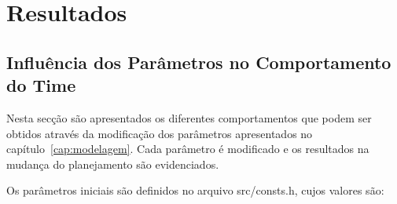 \chapter{Resultados}\label{cap:resultados}



\section{Influência dos Parâmetros no Comportamento do Time}

Nesta secção são apresentados os diferentes comportamentos
que podem ser obtidos através da modificação dos parâmetros
apresentados no capítulo~\ref{cap:modelagem}. Cada parâmetro
é modificado e os resultados na mudança do planejamento são
evidenciados.

Os parâmetros iniciais são definidos no arquivo src/consts.h, %
cujos valores são:

